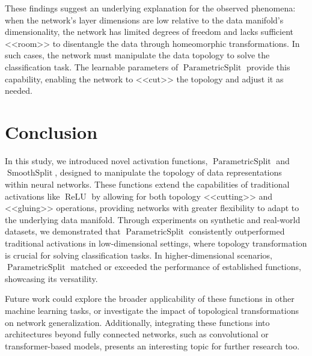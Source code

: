 \documentclass{esannV2}
\DeclareMathOperator{\relu}{\mathrm{ReLU}}
\DeclareMathOperator{\smoothsplit}{\mathrm{SmoothSplit}}
\DeclareMathOperator{\parametricsplit}{\mathrm{ParametricSplit}}
\begin{document}
These findings suggest an underlying explanation for the observed phenomena: when the network's layer dimensions are low relative to the data manifold's dimensionality, the network has limited degrees of freedom and lacks sufficient <<room>> to disentangle the data through homeomorphic transformations. In such cases, the network must manipulate the data topology to solve the classification task. The learnable parameters of \( \parametricsplit \) provide this capability, enabling the network to <<cut>> the topology and adjust it as needed.

\section{Conclusion}
In this study, we introduced novel activation functions, \( \parametricsplit \) and \( \smoothsplit \), designed to manipulate the topology of data representations within neural networks. These functions extend the capabilities of traditional activations like \( \relu \) by allowing for both topology <<cutting>> and <<gluing>> operations, providing networks with greater flexibility to adapt to the underlying data manifold. Through experiments on synthetic and real-world datasets, we demonstrated that \( \parametricsplit \) consistently outperformed traditional activations in low-dimensional settings, where topology transformation is crucial for solving classification tasks. In higher-dimensional scenarios, \( \parametricsplit \) matched or exceeded the performance of established functions, showcasing its versatility.

Future work could explore the broader applicability of these functions in other machine learning tasks, or investigate the impact of topological transformations on network generalization. Additionally, integrating these functions into architectures beyond fully connected networks, such as convolutional or transformer-based models, presents an interesting topic for further research too.

\begin{footnotesize}
  
  
\end{footnotesize}
\end{document}
